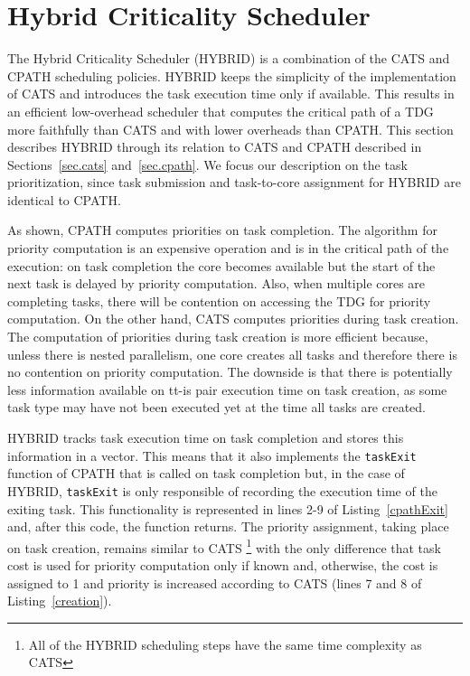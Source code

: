 \section{Hybrid Criticality Scheduler}
\label{sec.scheduling.hybrid}

The Hybrid Criticality Scheduler (HYBRID) is a combination of the CATS and CPATH scheduling policies.
HYBRID keeps the simplicity of the implementation of CATS and introduces the task execution time only if available.
This results in an efficient low-overhead scheduler that computes the critical path of a TDG more faithfully than CATS and with lower overheads than CPATH.
This section describes HYBRID through its relation to CATS and CPATH described in Sections~\ref{sec.cats} and~\ref{sec.cpath}. 
We focus our description on the task prioritization, since task submission and task-to-core assignment for HYBRID are identical to CPATH.

As shown, CPATH computes priorities on task completion. 
The algorithm for priority computation is an expensive operation and is in the critical path of the execution:
on task completion the core becomes available but the start of the next task is delayed by priority computation.
Also, when multiple cores are completing tasks, there will be contention on accessing the TDG for priority computation.
On the other hand, CATS computes priorities during task creation.
The computation of priorities during task creation is more efficient because, unless there is nested parallelism, one core creates all tasks
and therefore there is no contention on priority computation. The downside is that there is potentially less information available 
on tt-is pair execution time on task creation, as some task type may have not been executed yet at the time all tasks are created.


HYBRID tracks task execution time on task completion and stores this information in a vector.
This means that it also implements the \texttt{taskExit} function of CPATH that is called on task completion but, in the case of HYBRID, \texttt{taskExit} is only responsible of recording the execution time of the exiting task.
This functionality is represented in lines 2-9 of Listing~\ref{cpathExit} and, after this code, the function returns.
The priority assignment, taking place on task creation, remains similar to CATS \footnote{All of the HYBRID scheduling steps have the same time complexity as CATS} with the only difference that task cost is used for priority computation only if known and, otherwise, the cost is assigned to 1 and priority is increased according to CATS (lines 7 and 8 of Listing~\ref{creation}).

